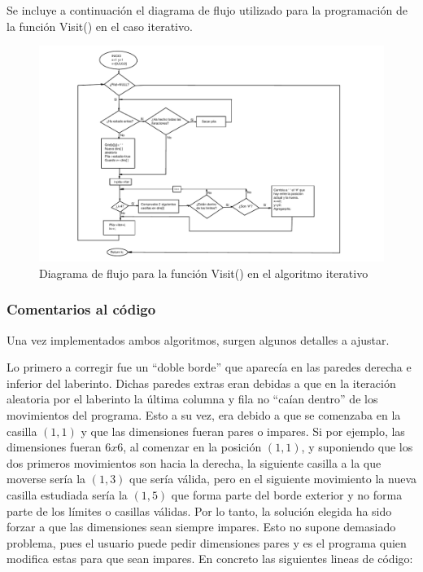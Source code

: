 \documentclass[12pt,a4paper]{article}
\begin{document}
Se incluye a continuación el diagrama de flujo utilizado para la programación de la función \textsf{Visit()} en el caso iterativo.

\begin{figure}[H]
	\hspace{-4.3cm}
	\includegraphics[scale=1.05]{fotos/diagrama.pdf}
	\caption{Diagrama de flujo para la función \textsf{Visit()} en el algoritmo iterativo}
	\label{diagrama}
\end{figure}

\subsubsection{Comentarios al código}

Una vez implementados ambos algoritmos, surgen algunos detalles a ajustar.

Lo primero a corregir fue un ``doble borde'' que aparecía en las paredes derecha e inferior del laberinto. Dichas paredes extras eran debidas a que en la iteración aleatoria por el laberinto la última columna y fila no ``caían dentro'' de los movimientos del programa. Esto a su vez, era debido a que se comenzaba en la casilla $(1,1)$ y que las dimensiones fueran pares o impares. Si por ejemplo, las dimensiones fueran $6x6$, al comenzar en la posición $(1,1)$, y suponiendo que los dos primeros movimientos son hacia la derecha, la siguiente casilla a la que moverse sería la $(1,3)$ que sería válida, pero en el siguiente movimiento la nueva casilla estudiada sería la $(1,5)$ que forma parte del borde exterior y no forma parte de los límites o casillas válidas. Por lo tanto, la solución elegida ha sido forzar a que las dimensiones sean siempre impares. Esto no supone demasiado problema, pues el usuario puede pedir dimensiones pares y es el programa quien modifica estas para que sean impares. En concreto las siguientes lineas de código:
\end{document}
